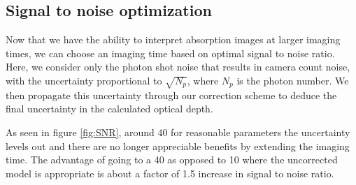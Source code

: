 \documentclass[12pt]{iopart}
\begin{document}
\subsection{Signal to noise optimization}
Now that we have the ability to interpret absorption images at larger imaging times, we can choose an imaging time based on optimal signal to noise ratio. Here, we consider only the photon shot noise that results in camera count noise, with the uncertainty proportional to $\sqrt{N_p}$, where $N_p$ is the photon number. We then propagate this uncertainty through our correction scheme to deduce the final uncertainty in the calculated optical depth. 
\par As seen in figure \ref{fig:SNR}, around 40\us{} for reasonable parameters the uncertainty levels out and there are no longer appreciable benefits by extending the imaging time. The advantage of going to a 40\us{} as opposed to 10\us{} where the uncorrected model is appropriate is about a factor of  1.5 increase in signal to noise ratio. 
\end{document}
